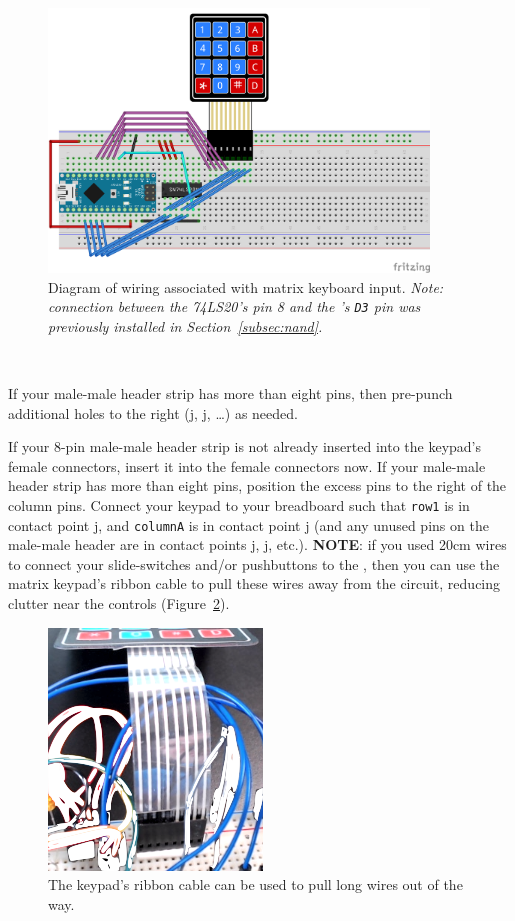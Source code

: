 \begin{figure}%
    \centering
    \includegraphics[width=0.9\textwidth]{fritzing_diagrams/keypad}
    \caption{Diagram of wiring associated with matrix keyboard input.
        \textit{Note: connection between the 74LS20's pin 8 and the \developmentboard's
        \texttt{D3} pin was previously installed in Section~\ref{subsec:nand}.}
        \label{fig:keypad-diagram}}
\end{figure}

\disconnect\

If your male-male header strip has more than eight pins, then pre-punch additional holes to the right (j, j, \dots) as needed.

If your 8-pin male-male header strip is not already inserted into the keypad's female connectors, insert it into the female connectors now.
If your male-male header strip has more than eight pins, position the excess pins to the right of the column pins.
Connect your keypad to your breadboard such that \texttt{row1} is in contact point j, and \texttt{columnA} is in contact point j (and any unused pins on the male-male header are in contact points j, j, etc.).
\textbf{NOTE}: if you used 20cm wires to connect your slide-switches and/or pushbuttons to the \developmentboard, then you can use the matrix keypad's ribbon cable to pull these wires away from the circuit, reducing clutter near the controls (Figure~\ref{fig:keypad-pullingwires}).

\begin{figure}
    \centering
    \includegraphics{keypad/keypad-pullingwires}
    \caption{The keypad's ribbon cable can be used to pull long wires out of the way. \label{fig:keypad-pullingwires}}
\end{figure}

